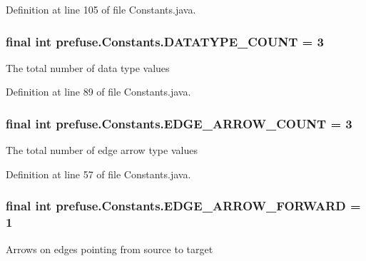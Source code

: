 \-Definition at line 105 of file \-Constants.\-java.

\hypertarget{interfaceprefuse_1_1_constants_a55783ae425983051a57bbade12326574}{
\subsubsection[{\-D\-A\-T\-A\-T\-Y\-P\-E\-\_\-\-C\-O\-U\-N\-T}]{\setlength{\rightskip}{0pt plus 5cm}final int {\bf prefuse.\-Constants.\-D\-A\-T\-A\-T\-Y\-P\-E\-\_\-\-C\-O\-U\-N\-T} = 3}}\label{interfaceprefuse_1_1_constants_a55783ae425983051a57bbade12326574}
\-The total number of data type values 

\-Definition at line 89 of file \-Constants.\-java.

\hypertarget{interfaceprefuse_1_1_constants_abdc8050e3c89e1b0f4c8d9861a64ed06}{
\subsubsection[{\-E\-D\-G\-E\-\_\-\-A\-R\-R\-O\-W\-\_\-\-C\-O\-U\-N\-T}]{\setlength{\rightskip}{0pt plus 5cm}final int {\bf prefuse.\-Constants.\-E\-D\-G\-E\-\_\-\-A\-R\-R\-O\-W\-\_\-\-C\-O\-U\-N\-T} = 3}}\label{interfaceprefuse_1_1_constants_abdc8050e3c89e1b0f4c8d9861a64ed06}
\-The total number of edge arrow type values 

\-Definition at line 57 of file \-Constants.\-java.

\hypertarget{interfaceprefuse_1_1_constants_ab648752c563c98d5c620988d24d9f7b4}{
\subsubsection[{\-E\-D\-G\-E\-\_\-\-A\-R\-R\-O\-W\-\_\-\-F\-O\-R\-W\-A\-R\-D}]{\setlength{\rightskip}{0pt plus 5cm}final int {\bf prefuse.\-Constants.\-E\-D\-G\-E\-\_\-\-A\-R\-R\-O\-W\-\_\-\-F\-O\-R\-W\-A\-R\-D} = 1}}\label{interfaceprefuse_1_1_constants_ab648752c563c98d5c620988d24d9f7b4}
\-Arrows on edges pointing from source to target 

